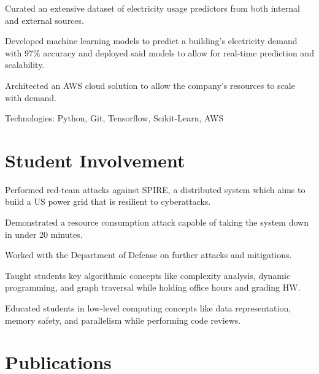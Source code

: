 \documentclass[]{deedy-resume-openfont}
\begin{document}
\begin{minipage}[t]{0.64\textwidth}
\begin{tightemize}
\item Curated an extensive dataset of electricity usage predictors from
both internal and external sources.
\item Developed machine learning models to predict a building's electricity demand with 97\% 
accuracy and deployed said models to allow for real-time prediction and scalability.
\item Architected an AWS cloud solution to allow the company's resources to scale with demand.
\item Technologies: Python, Git, Tensorflow, Scikit-Learn, AWS
\end{tightemize}
\sectionsep

\section{Student Involvement}
\descript{}
\begin{tightemize}
    \item Performed red-team attacks against SPIRE, a distributed system which aims to
    build a US power grid that is resilient to cyberattacks.
    \item Demonstrated a resource consumption attack capable of taking the system down 
    in under 20 minutes.
    \item Worked with the Department of Defense on further attacks and mitigations.
\end{tightemize}
\sectionsep

\descript{}
\begin{tightemize}
    \item Taught students key algorithmic concepts like complexity analysis, 
    dynamic programming, and graph traversal while holding office hours and grading HW.
    \item Educated students in low-level computing concepts like data representation, 
    memory safety, and parallelism while performing code reviews.
\end{tightemize}
\sectionsep



\section{Publications} 
\renewcommand\refname{\vskip -1.5em} %

{\footnotesize
}
\nocite{*}

\end{minipage} 
\end{document}

